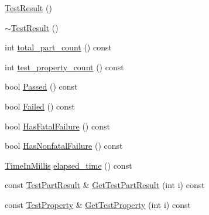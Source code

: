 \begin{DoxyCompactItemize}
\item 
\hyperlink{classtesting_1_1_test_result_a5cf5dd6f416b7334ea601aab21a2fda5}{Test\-Result} ()
\item 
\hyperlink{classtesting_1_1_test_result_a41f407680b725b75d7eadc3230bc3315}{$\sim$\-Test\-Result} ()
\item 
int \hyperlink{classtesting_1_1_test_result_ae6a378ec743edfbed55890c955d0adc8}{total\-\_\-part\-\_\-count} () const 
\item 
int \hyperlink{classtesting_1_1_test_result_a5075f9d595d51c7cc2f5c0921e622831}{test\-\_\-property\-\_\-count} () const 
\item 
bool \hyperlink{classtesting_1_1_test_result_aa46a04342f02ec297357f47288da3ef3}{Passed} () const 
\item 
bool \hyperlink{classtesting_1_1_test_result_abb5d051bf958071c14020132a4d6cc07}{Failed} () const 
\item 
bool \hyperlink{classtesting_1_1_test_result_ace61ce992083a9124f9ff0e99a2041cc}{Has\-Fatal\-Failure} () const 
\item 
bool \hyperlink{classtesting_1_1_test_result_a34e6901b9772f51ce4f17a5517c26607}{Has\-Nonfatal\-Failure} () const 
\item 
\hyperlink{namespacetesting_a992de1d091ce660f451d1e8b3ce30fd6}{Time\-In\-Millis} \hyperlink{classtesting_1_1_test_result_a582f6383265d0619df812b75499d0616}{elapsed\-\_\-time} () const 
\item 
const \hyperlink{classtesting_1_1_test_part_result}{Test\-Part\-Result} \& \hyperlink{classtesting_1_1_test_result_a5ea65e4a7c4fc9c9dc9578223a599a7c}{Get\-Test\-Part\-Result} (int i) const 
\item 
const \hyperlink{classtesting_1_1_test_property}{Test\-Property} \& \hyperlink{classtesting_1_1_test_result_a89a4f580a5d969b36e016cd309b235bd}{Get\-Test\-Property} (int i) const 
\end{DoxyCompactItemize}
